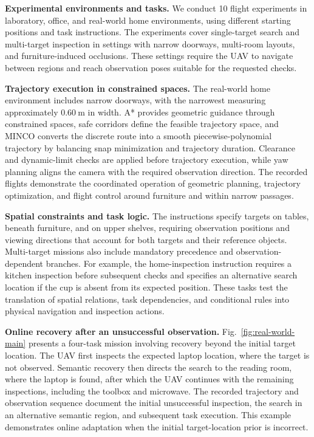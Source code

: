 \documentclass[letterpaper,10pt,journal]{IEEEtran}
\begin{document}
\textbf{Experimental environments and tasks.}
We conduct 10 flight experiments in laboratory, office, and real-world home environments, using different starting positions and task instructions. The experiments cover single-target search and multi-target inspection in settings with narrow doorways, multi-room layouts, and furniture-induced occlusions. These settings require the UAV to navigate between regions and reach observation poses suitable for the requested checks.

\textbf{Trajectory execution in constrained spaces.}
The real-world home environment includes narrow doorways, with the narrowest measuring approximately $0.60~\mathrm m$ in width. A* provides geometric guidance through constrained spaces, safe corridors define the feasible trajectory space, and MINCO converts the discrete route into a smooth piecewise-polynomial trajectory by balancing snap minimization and trajectory duration. Clearance and dynamic-limit checks are applied before trajectory execution, while yaw planning aligns the camera with the required observation direction. The recorded flights demonstrate the coordinated operation of geometric planning, trajectory optimization, and flight control around furniture and within narrow passages.

\textbf{Spatial constraints and task logic.}
The instructions specify targets on tables, beneath furniture, and on upper shelves, requiring observation positions and viewing directions that account for both targets and their reference objects. Multi-target missions also include mandatory precedence and observation-dependent branches. For example, the home-inspection instruction requires a kitchen inspection before subsequent checks and specifies an alternative search location if the cup is absent from its expected position. These tasks test the translation of spatial relations, task dependencies, and conditional rules into physical navigation and inspection actions.

\textbf{Online recovery after an unsuccessful observation.}
Fig.~\ref{fig:real-world-main} presents a four-task mission involving recovery beyond the initial target location. The UAV first inspects the expected laptop location, where the target is not observed. Semantic recovery then directs the search to the reading room, where the laptop is found, after which the UAV continues with the remaining inspections, including the toolbox and microwave. The recorded trajectory and observation sequence document the initial unsuccessful inspection, the search in an alternative semantic region, and subsequent task execution. This example demonstrates online adaptation when the initial target-location prior is incorrect.
\end{document}
